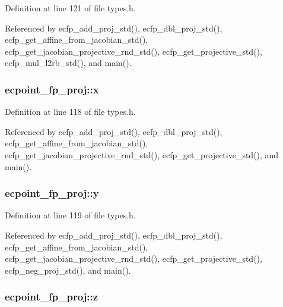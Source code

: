 Definition at line 121 of file types.\-h.



Referenced by ecfp\-\_\-add\-\_\-proj\-\_\-std(), ecfp\-\_\-dbl\-\_\-proj\-\_\-std(), ecfp\-\_\-get\-\_\-affine\-\_\-from\-\_\-jacobian\-\_\-std(), ecfp\-\_\-get\-\_\-jacobian\-\_\-projective\-\_\-rnd\-\_\-std(), ecfp\-\_\-get\-\_\-projective\-\_\-std(), ecfp\-\_\-mul\-\_\-l2rb\-\_\-std(), and main().

\hypertarget{structecpoint__fp__proj_a2262d0cad1d0cd97349b8b07a2b1f46a}{
\subsubsection[{x}]{ ecpoint\-\_\-fp\-\_\-proj\-::x}}\label{structecpoint__fp__proj_a2262d0cad1d0cd97349b8b07a2b1f46a}


Definition at line 118 of file types.\-h.



Referenced by ecfp\-\_\-add\-\_\-proj\-\_\-std(), ecfp\-\_\-dbl\-\_\-proj\-\_\-std(), ecfp\-\_\-get\-\_\-affine\-\_\-from\-\_\-jacobian\-\_\-std(), ecfp\-\_\-get\-\_\-jacobian\-\_\-projective\-\_\-rnd\-\_\-std(), ecfp\-\_\-get\-\_\-projective\-\_\-std(), and main().

\hypertarget{structecpoint__fp__proj_a3c6f46c1e0cb729d836ba6356b26840e}{
\subsubsection[{y}]{ ecpoint\-\_\-fp\-\_\-proj\-::y}}\label{structecpoint__fp__proj_a3c6f46c1e0cb729d836ba6356b26840e}


Definition at line 119 of file types.\-h.



Referenced by ecfp\-\_\-add\-\_\-proj\-\_\-std(), ecfp\-\_\-dbl\-\_\-proj\-\_\-std(), ecfp\-\_\-get\-\_\-affine\-\_\-from\-\_\-jacobian\-\_\-std(), ecfp\-\_\-get\-\_\-jacobian\-\_\-projective\-\_\-rnd\-\_\-std(), ecfp\-\_\-get\-\_\-projective\-\_\-std(), ecfp\-\_\-neg\-\_\-proj\-\_\-std(), and main().

\hypertarget{structecpoint__fp__proj_a0625d3b4fd1ae6fb61bdbf37c062feb0}{
\subsubsection[{z}]{ ecpoint\-\_\-fp\-\_\-proj\-::z}}\label{structecpoint__fp__proj_a0625d3b4fd1ae6fb61bdbf37c062feb0}



